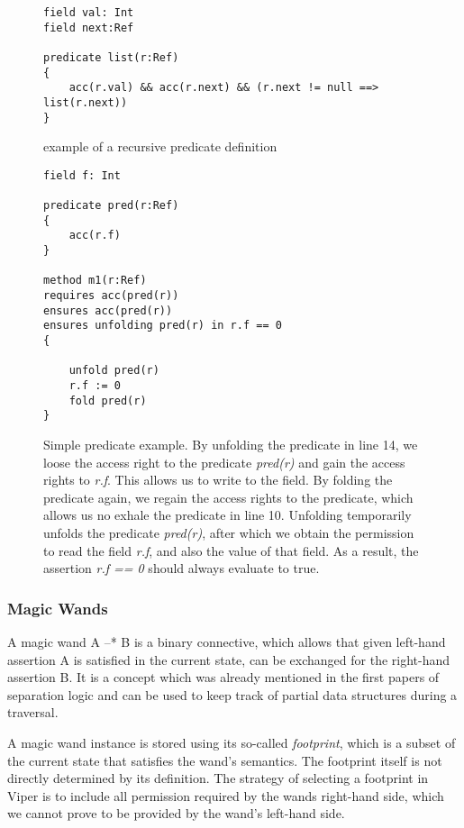 \documentclass[12pt]{article}
\begin{document}
\begin{figure}[h]
  \centering
\begin{lstlisting}
field val: Int
field next:Ref

predicate list(r:Ref)
{
    acc(r.val) && acc(r.next) && (r.next != null ==> list(r.next))
}
\end{lstlisting}
\caption[recursive predicate]
   {example of a recursive predicate definition}
\label{rec}
\end{figure}


\begin{figure}[h]
  \centering
\begin{lstlisting}
field f: Int

predicate pred(r:Ref)
{
    acc(r.f)
}

method m1(r:Ref)
requires acc(pred(r))
ensures acc(pred(r))
ensures unfolding pred(r) in r.f == 0
{

    unfold pred(r)
    r.f := 0
    fold pred(r)
}
\end{lstlisting}
\caption[predicate example]
   {Simple predicate example. By unfolding the predicate in line 14, we loose the access right to the predicate \textit{pred(r)} and gain the access rights to \textit{r.f}. This allows us to write to the field. By folding the predicate again, we regain the access rights to the predicate, which allows us no exhale the predicate in line 10. Unfolding temporarily unfolds the predicate \textit{pred(r)}, after which we obtain the permission to read the field \textit{r.f}, and also the value of that field. As a result, the assertion \textit{r.f == 0} should always evaluate to true.}
\end{figure}

\subsubsection{Magic Wands}
A magic wand A --* B is a binary connective, which allows that given left-hand assertion A is satisfied in the current state, can be exchanged for the right-hand assertion B. It is a concept which was already mentioned in the first papers of separation logic\cite{reynolds2002separation} and can be used to keep track of partial data structures during a traversal.

A magic wand instance is stored using its so-called \textit{footprint}, which is a subset of the current state that satisfies the wand's semantics. The footprint itself is not directly determined by its definition. The strategy of selecting a footprint in Viper is to include all permission required by the wands right-hand side, which we cannot prove to be provided by the wand's left-hand side\cite{magicwand}.
\end{document}
